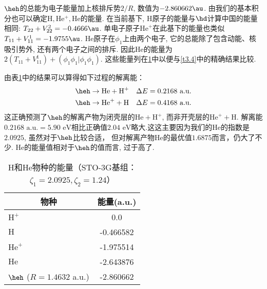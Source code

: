 $\heh$的总能为电子能量加上核排斥势$2/R$, 数值为$-2.860662\au$. 由我们的基本积分也可以确定$\mathrm{H,He^+,He}$的能量. 在当前基下, $\mathrm{H}$原子的能量与$\hd$计算中国的能量相同: $T_{22}+V_{22}^2=-0.4666\au$. 单电子原子$\mathrm{He}^+$在此基下的能量也类似$T_{11}+V_{11}^1=-1.9755\au$. $\mathrm{He}$原子在$\phi_1$上由两个电子, 它的总能除了包含动能、核吸引势外, 还有两个电子之间的排斥. 因此$\mathrm{He}$的能量为$2(T_{11}+V_{11}^1)+(\phi_1\phi_1|\phi_1\phi_1)$. 这些能量列在\ref{t3.6}中以便与\ref{t3.4}中的精确结果比较.

由表\ref{t3.6}中的结果可以算得如下过程的解离能：
\begin{align}
\heh & \to \text{He} + \text{H}^+ \quad \Delta E = 0.2168\,\, \text{a.u.}\\
\heh & \to \text{He}^+ + \text{H} \quad \Delta E = 0.4168\,\, \text{a.u.}
\end{align}
这正确预测了$\heh$的解离产物为闭壳层的$\text{He}+\text{H}^+$, 而非开壳层的$\text{He}^++\text{H}$. 解离能$0.2168\,\,\text{a.u.}=5.90\,\,\text{eV}$相比正确值$2.04\,\,\text{eV}$略大.这这主要因为我们的$\text{He}$的指数是$2.0925$, 虽然对于$\heh$比较合适， 但对解离产物$\text{He}$的最优值$1.6875$而言，仍大了不少. $\text{He}$的能量值相对于$\heh$的值而言, 过于高了.
\begin{table}[h]
	\centering\caption{$\text{H}$和$\text{He}$物种的能量（STO-3G基组： $\zeta_1=2.0925,\zeta_2=1.24$）}
	\begin{tabular}{lc}
		\hline
		\multicolumn{1}{c}{物种} & 能量(a.u.)\\\hline
		$\text{H}^+$             & 0.0\\
		$\text{H}$               & -0.466582\\
		$\text{He}^+$            & -1.975514\\
		$\text{He}$              & -2.643876\\
		$\heh$ ($R=1.4632$ a.u.) & -2.860662\\
		\hline
	\end{tabular}
\label{t3.6}
\end{table}

